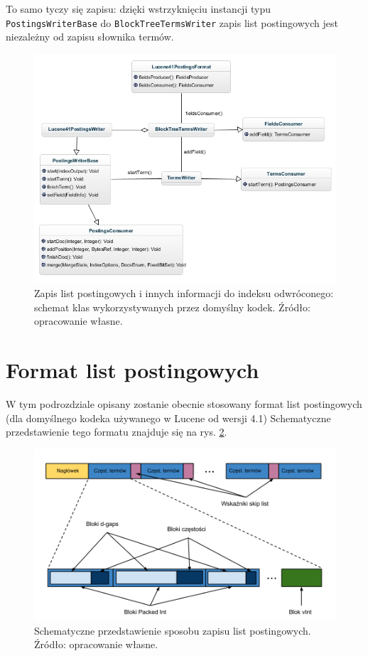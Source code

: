 To samo tyczy się zapisu: dzięki wstrzyknięciu instancji typu \texttt{PostingsWriterBase} do \texttt{BlockTreeTermsWriter} zapis list postingowych jest niezależny od zapisu słownika termów.

\begin{figure}[here]
 \includegraphics[scale=0.64]{pictures/Lucene41PostingsFormatWrite.jpg}
 \caption{Zapis list postingowych i innych informacji do indeksu odwróconego: schemat klas wykorzystywanych przez domyślny kodek. Źródło: opracowanie własne. \label{fig:postingFormatWrite}}
\end{figure}

\section{Format list postingowych}

W tym podrozdziale opisany zostanie obecnie stosowany format list postingowych (dla domyślnego kodeka używanego w Lucene od wersji 4.1) Schematyczne przedstawienie tego formatu znajduje się na rys. \ref{fig:postingCodingFormat}.

\begin{figure}[here]
 \includegraphics[scale=0.37]{pictures/PostingCodingFormat.png}
 \caption{Schematyczne przedstawienie sposobu zapisu list postingowych. Źródło: opracowanie własne. \label{fig:postingCodingFormat}}
\end{figure}


